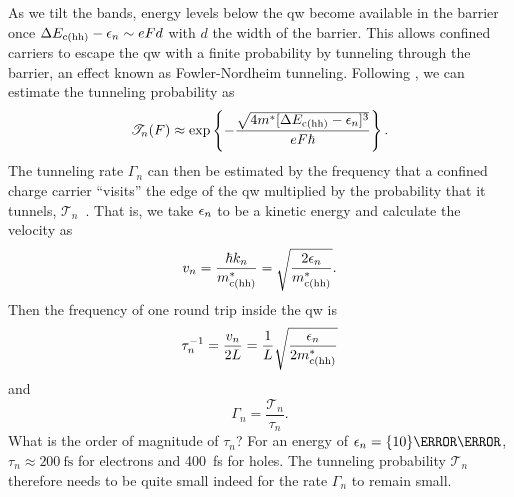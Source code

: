 As we tilt the bands, energy levels below the \gls{qw} become available in the barrier once $\Delta E_{\mathrm{c}(\mathrm{hh})} - \epsilon_{n}\sim eFd$ with $d$ the width of the barrier.
This allows confined carriers to escape the \gls{qw} with a finite probability by tunneling through the barrier, an effect known as Fowler-Nordheim tunneling.
Following , we can estimate the tunneling probability as
\begin{equation}\label{eq:exp:theory:qcse:tunneling:probability}
    \mathscr{T}_n(F) \approx \exp\left\lbrace -\frac{\sqrt{4 m^\ast [\Delta E_{\mathrm{c}(\mathrm{hh})} - \epsilon_n]^3}}{e F\hbar}\right\rbrace.
\end{equation}
The tunneling rate $\Gamma_n$ can then be estimated by the frequency that a confined charge carrier \enquote{visits} the edge of the \gls{qw} multiplied by the probability that it tunnels, $\mathscr{T}_n$~\cite{Larsson1988}.
That is, we take $\epsilon_n$ to be a kinetic energy and calculate the velocity as
\begin{equation}
    v_n = \frac{\hbar k_n}{m^\ast_{\mathrm{c}(\mathrm{hh})}} = \sqrt{\frac{2 \epsilon_n}{m^\ast_{\mathrm{c}(\mathrm{hh})}}}.
\end{equation}
Then the frequency of one round trip inside the \gls{qw} is
\begin{equation}
    \tau_n^{-1} = \frac{v_n}{2L} = \frac{1}{L}\sqrt{\frac{\epsilon_n}{2 m^\ast_{\mathrm{c}(\mathrm{hh})}}}
\end{equation}
and
\begin{equation}\label{eq:exp:theory:qcse:tunneling:rate}
    \Gamma_n = \frac{\mathscr{T}_n}{\tau_n}.
\end{equation}
What is the order of magnitude of $\tau_n$?
For an energy of $\eps_n = \qty{10}{\milli\electronvolt}$, $\tau_n\approx\qty{200}{\femto\second}$ for electrons and \qty{400}{\femto\second} for holes.
The tunneling probability $\mathscr{T}_n$ therefore needs to be quite small indeed for the rate $\Gamma_n$ to remain small.

